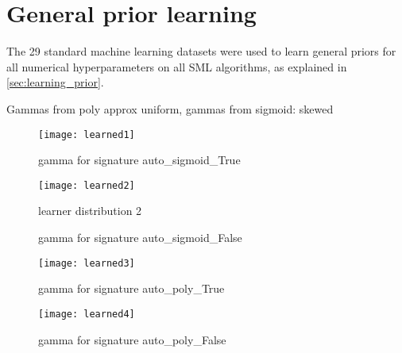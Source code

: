 \section{General prior learning}

The 29 standard machine learning datasets were used to learn general priors for all numerical
hyperparameters on all SML algorithms, as explained in \ref{sec:learning_prior}. 

Gammas from poly approx uniform, gammas from sigmoid: skewed


\begin{figure}[h!]
	\centering
	\texttt{[image: learned1]}
	\caption{gamma for signature auto\_sigmoid\_True}
	\label{img:learned1}
\end{figure}


\begin{figure}[h!]
	\centering
	\texttt{[image: learned2]}
	\caption{learner distribution 2}
	\caption{gamma for signature auto\_sigmoid\_False}
	\label{img:learned2}
\end{figure}


\begin{figure}[h!]
	\centering
	\texttt{[image: learned3]}
	\caption{gamma for signature auto\_poly\_True}
	\label{img:learned3}
\end{figure}


\begin{figure}[h!]
	\centering
	\texttt{[image: learned4]}
	\caption{gamma for signature auto\_poly\_False}
	\label{img:learned4}
\end{figure}


